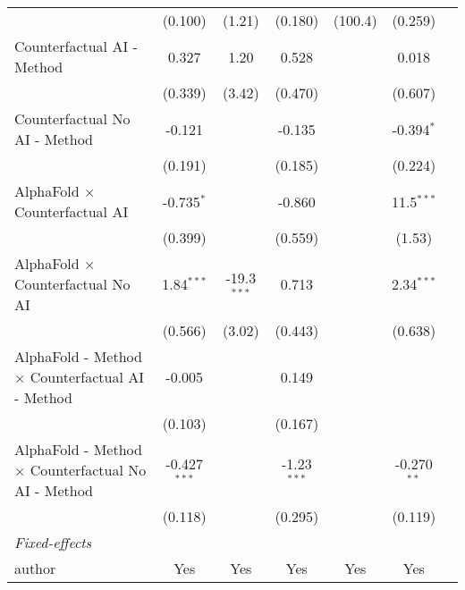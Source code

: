 \begin{tabular}{lcccccc}
                                                              & (0.100)        & (1.21)        & (0.180)       & (100.4) & (0.259)       &   \\   
   Counterfactual AI - Method                                 & 0.327          & 1.20          & 0.528         &         & 0.018         &   \\   
                                                              & (0.339)        & (3.42)        & (0.470)       &         & (0.607)       &   \\   
   Counterfactual No AI - Method                              & -0.121         &               & -0.135        &         & -0.394$^{*}$  &   \\   
                                                              & (0.191)        &               & (0.185)       &         & (0.224)       &   \\   
   AlphaFold $\times$ Counterfactual AI                       & -0.735$^{*}$   &               & -0.860        &         & 11.5$^{***}$  &   \\   
                                                              & (0.399)        &               & (0.559)       &         & (1.53)        &   \\   
   AlphaFold $\times$ Counterfactual No AI                    & 1.84$^{***}$   & -19.3$^{***}$ & 0.713         &         & 2.34$^{***}$  &   \\   
                                                              & (0.566)        & (3.02)        & (0.443)       &         & (0.638)       &   \\   
   AlphaFold - Method $\times$ Counterfactual AI - Method     & -0.005         &               & 0.149         &         &               &   \\   
                                                              & (0.103)        &               & (0.167)       &         &               &   \\   
   AlphaFold - Method $\times$ Counterfactual No AI - Method  & -0.427$^{***}$ &               & -1.23$^{***}$ &         & -0.270$^{**}$ &   \\   
                                                              & (0.118)        &               & (0.295)       &         & (0.119)       &   \\   
   \midrule
   \emph{Fixed-effects}\\
   author                                                     & Yes            & Yes           & Yes           & Yes     & Yes           & \\  

\end{tabular}
